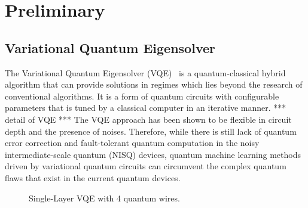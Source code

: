 \section{Preliminary}

\subsection{Variational Quantum Eigensolver}

The Variational Quantum Eigensolver (VQE)~\cite{} is a quantum-classical hybrid algorithm that can provide solutions in regimes which lies beyond the research of conventional algorithms. It is a form of quantum circuits with configurable parameters that is tuned by a classical computer in an iterative manner. *** detail of VQE *** The VQE approach has been shown to be flexible in circuit depth and the presence of noises. Therefore, while there is still lack of quantum error correction and fault-tolerant quantum computation in the noisy intermediate-scale quantum (NISQ) devices, quantum machine learning methods driven by variational quantum circuits can circumvent the complex quantum flaws that exist in the current quantum devices.


\begin{figure}[htp]
  \centering
  \caption{Single-Layer VQE with 4 quantum wires.}
\end{figure}



